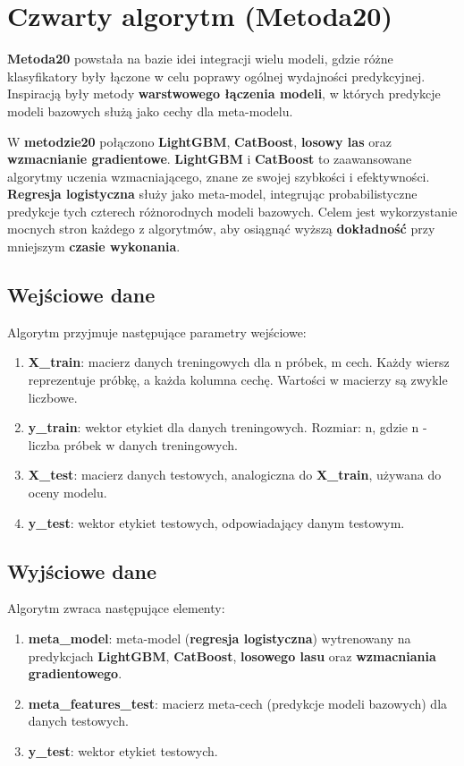 \section{Czwarty algorytm (\textbf{Metoda20})}
\textbf{Metoda20} powstała na bazie idei integracji wielu modeli, gdzie różne klasyfikatory były łączone w celu poprawy ogólnej wydajności predykcyjnej. Inspiracją były metody \textbf{warstwowego łączenia modeli}, w których predykcje modeli bazowych służą jako cechy dla meta-modelu.

W \textbf{metodzie20} połączono \textbf{LightGBM}, \textbf{CatBoost}, \textbf{losowy las} oraz \textbf{wzmacnianie gradientowe}. \textbf{LightGBM} i \textbf{CatBoost} to zaawansowane algorytmy uczenia wzmacniającego, znane ze swojej szybkości i efektywności. \textbf{Regresja logistyczna} służy jako meta-model, integrując probabilistyczne predykcje tych czterech różnorodnych modeli bazowych. Celem jest wykorzystanie mocnych stron każdego z algorytmów, aby osiągnąć wyższą \textbf{dokładność} przy mniejszym \textbf{czasie wykonania}.

\subsection{Wejściowe dane}
Algorytm przyjmuje następujące parametry wejściowe:

\begin{enumerate}
	\def\labelenumi{\arabic{enumi}.}
	\item
	      \textbf{X\_train}: macierz danych treningowych dla n próbek, m cech. Każdy wiersz reprezentuje próbkę, a każda kolumna cechę. Wartości w macierzy są zwykle liczbowe.
	\item
	      \textbf{y\_train}: wektor etykiet dla danych treningowych. Rozmiar: n, gdzie n - liczba próbek w danych treningowych.
	\item
	      \textbf{X\_test}: macierz danych testowych, analogiczna do \textbf{X\_train}, używana do oceny modelu.
	\item
	      \textbf{y\_test}: wektor etykiet testowych, odpowiadający danym testowym.
\end{enumerate}

\subsection{Wyjściowe dane}
Algorytm zwraca następujące elementy:

\begin{enumerate}
	\def\labelenumi{\arabic{enumi}.}
	\item
	      \textbf{meta\_model}: meta-model (\textbf{regresja logistyczna}) wytrenowany na predykcjach \textbf{LightGBM}, \textbf{CatBoost}, \textbf{losowego lasu} oraz \textbf{wzmacniania gradientowego}.
	\item
	      \textbf{meta\_features\_test}: macierz meta-cech (predykcje modeli bazowych) dla danych testowych.
	\item
	      \textbf{y\_test}: wektor etykiet testowych.
\end{enumerate}

